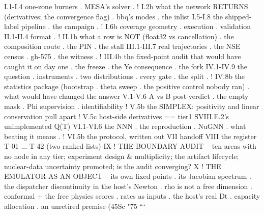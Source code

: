 \begin{srclistingtiny}
I.1-I.4   one-zone burners . MESA's solver . ! I.2b what the network RETURNS
          (derivatives; the convergence flag) . bbq's modes . the inlist
I.5-I.8   the shipped-label pipeline . the campaign . ! I.6b coverage geometry .
          execution . validation
II.1-II.4 format . ! II.1b what a row is NOT (float32 vs cancellation) .
          the composition route . the PIN . the stall
III.1-III.7 real trajectories . the NSE census . gh-575 . the witness .
            ! III.4b the fixed-point audit that would have caught it on day one .
            the freeze . the Ye consequence . the fork
IV.1-IV.9  the question . instruments . two distributions . every gate .
           the split . ! IV.8b the statistics package (bootstrap . theta sweep .
           the positive control nobody ran) . what would have changed the answer
V.1-V.6    A vs B post-verdict . the empty mask . Phi supervision . identifiability
           ! V.5b the SIMPLEX: positivity and linear conservation pull apart
           ! V.5c host-side derivatives == tier1 SVIII.E.2's unimplemented Q(T)
VI.1-VI.6  the NNN . the reproduction . NuGNN . what beating it means .
           ! VI.5b the protocol, written out
VII        handoff        VIII  the register T-01 ... T-42 (two ranked lists)
IX         ! THE BOUNDARY AUDIT -- ten areas with no node in any tier;
           experiment design & multiplicity; the artifact lifecycle;
           nuclear-data uncertainty promoted; is the audit converging?
X          ! THE EMULATOR AS AN OBJECT -- its own fixed points . its Jacobian
           spectrum . the dispatcher discontinuity in the host's Newton .
           rho is not a free dimension . conformal + the free physics scores .
           rates as inputs . the host's real Dt . capacity allocation .
           an unretired premise (45Sc "75%
```\end{srclistingtiny}
